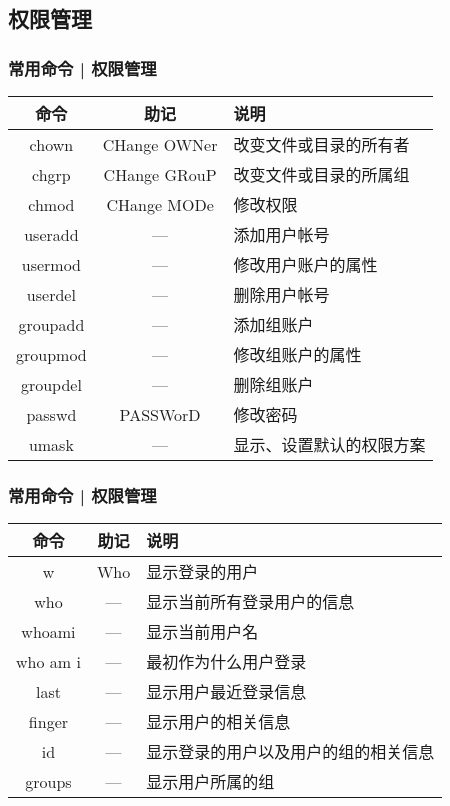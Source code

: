 \subsection{权限管理}
\begin{frame}
  \frametitle{常用命令 | \alert{权限管理}}
  \begin{table}
    \centering
    \begin{tabularx}{0.9\textwidth}{ccX}
      \hline
      \rowcolor{blue!50}命令 & 助记 & 说明\\
      \hline
      chown & CHange OWNer & 改变文件或目录的所有者\\
      chgrp & CHange GRouP & 改变文件或目录的所属组\\
      chmod & CHange MODe & 修改权限\\
      useradd & --- & 添加用户帐号\\
      usermod & --- & 修改用户账户的属性\\
      userdel & --- & 删除用户帐号\\
      groupadd & --- & 添加组账户\\
      groupmod & --- & 修改组账户的属性\\
      groupdel & --- & 删除组账户\\
      passwd & PASSWorD & 修改密码\\
      umask & --- & 显示、设置默认的权限方案\\
      \hline
    \end{tabularx}
  \end{table}
\end{frame}

\begin{frame}
  \frametitle{常用命令 | \alert{权限管理}}
  \begin{table}
    \centering
    \begin{tabularx}{0.9\textwidth}{ccX}
      \hline
      \rowcolor{blue!50}命令 & 助记 & 说明\\
      \hline
      w & Who & 显示登录的用户\\
      who & --- & 显示当前所有登录用户的信息\\
      whoami & --- & 显示当前用户名\\
      who am i & --- & 最初作为什么用户登录\\
      last & --- & 显示用户最近登录信息\\
      finger & --- & 显示用户的相关信息\\
      id & --- & 显示登录的用户以及用户的组的相关信息\\
      groups & --- & 显示用户所属的组\\
      \hline
    \end{tabularx}
  \end{table}
\end{frame}

